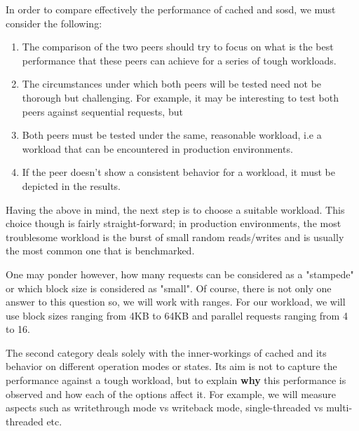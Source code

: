 In order to compare effectively the performance of cached and sosd, we must 
consider the following: 

\begin{enumerate}
	\item The comparison of the two peers should try to focus on what is 
		the best performance that these peers can achieve for a series 
		of tough workloads.
	\item The circumstances under which both peers will be tested need not 
		be thorough but challenging. For example, it may be interesting 
		to test both peers against sequential requests, but
		
	\item Both peers must be tested under the same, reasonable workload, 
		i.e a workload that can be encountered in production 
		environments.
	\item If the peer doesn't show a consistent behavior for a workload, it 
		must be depicted in the results.
\end{enumerate}

Having the above in mind, the next step is to choose a suitable workload.  This 
choice though is fairly straight-forward; in production environments, the most 
troublesome workload is the burst of small random reads/writes and is usually 
the most common one that is benchmarked.  

One may ponder however, how many requests can be considered as a "stampede" or 
which block size is considered as "small". Of course, there is not only one 
answer to this question so, we will work with ranges. For our workload, we will 
use block sizes ranging from 4KB to 64KB and parallel requests ranging from 4 
to 16.

The second category deals solely with the inner-workings of cached and its 
behavior on different operation modes or states. Its aim is not to capture the 
performance against a tough workload, but to explain \textbf{why} this 
performance is observed and how each of the options affect it. For example, we 
will measure aspects such as writethrough mode vs writeback mode, 
single-threaded vs multi-threaded etc.

